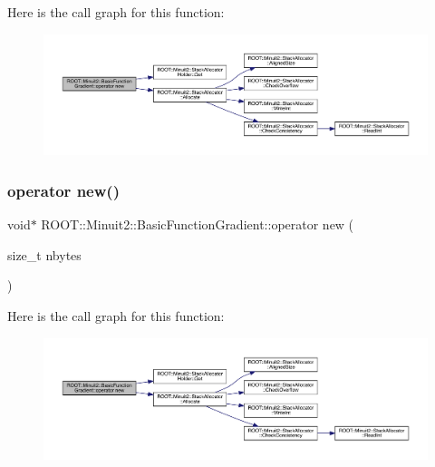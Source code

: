 Here is the call graph for this function\+:
\nopagebreak
\begin{figure}[H]
\begin{center}
\leavevmode
\includegraphics[width=350pt]{db/d85/classROOT_1_1Minuit2_1_1BasicFunctionGradient_a2b08ebb0074a43cfca91f74991c660d5_cgraph}
\end{center}
\end{figure}
\mbox{\label{classROOT_1_1Minuit2_1_1BasicFunctionGradient_a2b08ebb0074a43cfca91f74991c660d5}} 
\subsubsection{\texorpdfstring{operator new()}{operator new()}\hspace{0.1cm}{\footnotesize\ttfamily [3/3]}}
{\footnotesize\ttfamily void$\ast$ R\+O\+O\+T\+::\+Minuit2\+::\+Basic\+Function\+Gradient\+::operator new (\begin{DoxyParamCaption}\item[{size\+\_\+t}]{nbytes }\end{DoxyParamCaption})\hspace{0.3cm}{\ttfamily [inline]}}

Here is the call graph for this function\+:
\nopagebreak
\begin{figure}[H]
\begin{center}
\leavevmode
\includegraphics[width=350pt]{db/d85/classROOT_1_1Minuit2_1_1BasicFunctionGradient_a2b08ebb0074a43cfca91f74991c660d5_cgraph}
\end{center}
\end{figure}
\mbox{\label{classROOT_1_1Minuit2_1_1BasicFunctionGradient_a1bf2f76bab802466b8697136fbea33e4}} 
